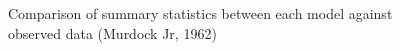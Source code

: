 \documentclass[
  letterpaper,
]{article}
\begin{document}
\begin{figure}

\begin{minipage}[t]{\linewidth}

{\centering 


}

\end{minipage}%
\newline
\begin{minipage}[t]{\linewidth}

{\centering 


}

\end{minipage}%

\caption{\label{fig-murd62summary}Comparison of summary statistics
between each model against observed data (Murdock Jr, 1962)}

\end{figure}
\end{document}
